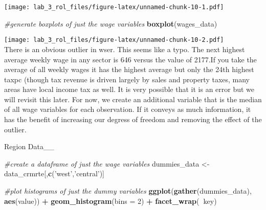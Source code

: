 \documentclass[
]{article}
\newenvironment{Shaded}{\begin{snugshade}}{\end{snugshade}}
\newcommand{\CommentTok}[1]{\textcolor[rgb]{0.56,0.35,0.01}{\textit{#1}}}
\newcommand{\DataTypeTok}[1]{\textcolor[rgb]{0.13,0.29,0.53}{#1}}
\newcommand{\DecValTok}[1]{\textcolor[rgb]{0.00,0.00,0.81}{#1}}
\newcommand{\KeywordTok}[1]{\textcolor[rgb]{0.13,0.29,0.53}{\textbf{#1}}}
\newcommand{\NormalTok}[1]{#1}
\newcommand{\OperatorTok}[1]{\textcolor[rgb]{0.81,0.36,0.00}{\textbf{#1}}}
\newcommand{\OtherTok}[1]{\textcolor[rgb]{0.56,0.35,0.01}{#1}}
\newcommand{\StringTok}[1]{\textcolor[rgb]{0.31,0.60,0.02}{#1}}
\begin{document}
\texttt{[image: lab\_3\_rol\_files/figure-latex/unnamed-chunk-10-1.pdf]}

\begin{Shaded}
\begin{Highlighting}[]
\CommentTok{#generate boxplots of just the wage variables}
\KeywordTok{boxplot}\NormalTok{(wages_data)}
\end{Highlighting}
\end{Shaded}

\texttt{[image: lab\_3\_rol\_files/figure-latex/unnamed-chunk-10-2.pdf]}\\
There is an obvious outlier in wser. This seems like a typo. The next
highest average weekly wage in any sector is 646 versus the value of
2177.If you take the average of all weekly wages it has the highest
average but only the 24th highest taxpc (though tax revenue is driven
largely by sales and property taxes, many areas have local income tax as
well. It is very possible that it is an error but we will revisit this
later. For now, we create an additional variable that is the median of
all wage variables for each observation. If it conveys as much
information, it has the benefit of increasing our degress of freedom and
removing the effect of the outlier.\\

\begin{Shaded}
\end{Shaded}

Region Data\_\_\\

\begin{Shaded}
\begin{Highlighting}[]
\CommentTok{#create a dataframe of just the wage variables}
\NormalTok{dummies_data <-}\StringTok{ }\NormalTok{data_crmrte[,}\KeywordTok{c}\NormalTok{(}\StringTok{'west'}\NormalTok{,}\StringTok{'central'}\NormalTok{)]}

\CommentTok{#plot histograms of just the dummy variables}
\KeywordTok{ggplot}\NormalTok{(}\KeywordTok{gather}\NormalTok{(dummies_data), }\KeywordTok{aes}\NormalTok{(value)) }\OperatorTok{+}\StringTok{ }
\StringTok{  }\KeywordTok{geom_histogram}\NormalTok{(}\DataTypeTok{bins =} \DecValTok{2}\NormalTok{) }\OperatorTok{+}\StringTok{ }
\StringTok{  }\KeywordTok{facet_wrap}\NormalTok{(}\OperatorTok{~}\NormalTok{key)}
\end{Highlighting}
\end{Shaded}
\end{document}
